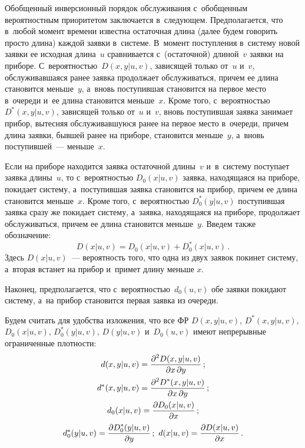 \begin{multicols}{2}
Обобщенный инверсионный порядок обслуживания
с~обобщенным вероятностным приоритетом заключается в~следующем.
Предполагается, что в~любой момент времени
известна остаточная длина (далее будем говорить
просто длина) каждой заявки в~системе.
В~момент поступления в~систему новой заявки ее
исходная длина~$u$ сравнивается с~(остаточной)
длиной~$v$ заявки на приборе.
С~вероятностью~$D(x,y|u,v)$, зависящей только от~$u$ и~$v$, обслуживавшаяся
ранее заявка продолжает обслуживаться, причем
ее длина становится меньше~$y$, а~вновь
поступившая становится на первое место в~очереди
и~ее длина становится меньше~$x$.
Кроме того, с~вероятностью~$D^*(x,y|u,v)$,
зависящей только от~$u$ и~$v$, вновь поступившая
заявка занимает прибор, вытесняя обслуживавшуюся
ранее на первое место в~очереди, причем длина
заявки, бывшей ранее на приборе, становится
меньше~$y$, а~вновь поступившей~--- меньше~$x$.

Если на приборе находится заявка остаточной
длины~$v$ и~в~систему поступает заявка
длины~$u$, то с~вероятностью $D_0(x|u,v)$
заявка, находящаяся на приборе, покидает
систему, а~поступившая заявка становится на
прибор, причем ее длина становится меньше~$x$.
Кроме того, с~вероятностью
$D_0^*(y|u,v)$ поступившая заявка сразу же
покидает систему, а~заявка, находящаяся на
приборе, продолжает обслуживаться, причем ее
длина становится меньше~$y$.
Введем также обозначение:
\begin{equation*}
D(x|u,v) = D_0(x|u,v) + D_0^*(x|u,v)\,.
\end{equation*}
Здесь $D(x|u,v)$~--- вероятность того, что одна
из двух заявок покинет систему, а~вторая встанет
на прибор и~примет длину меньше $x$.


Наконец, предполагается, что с~вероят\-ностью~$d_0(u,v)$ обе заявки покидают
систему, а~на прибор становится первая заявка
из очереди.

Будем считать для удобства изложения, что все
ФР $D(x,y|u,v)$, $D^*(x,y|u,v)$, $D_0(x|u,v)$,
$D_0^*(y|u,v)$, $D(y|u,v)$ и~$D_0(u,v)$
имеют непрерывные ограниченные плотности:
\begin{gather*}
d(x,y|u,v)=\displaystyle\frac{\displaystyle \partial^2 D(x,y|u,v)\mathstrut}{\displaystyle \partial x\, \partial y\mathstrut}\,;\\
d^*(x,y|u,v)=\displaystyle\frac{\displaystyle \partial^2 D^*(x,y|u,v)\mathstrut}{\displaystyle \partial x\, \partial y\mathstrut}\,;\\
d_0(x|u,v)= \displaystyle\frac{\displaystyle \partial D_0(x|u,v)\mathstrut}{\displaystyle \partial x\mathstrut}\,;\\
d_0^*(y|u,v)=\displaystyle\frac{\displaystyle \partial D_0^*(y|u,v)\mathstrut}{\displaystyle \partial y\mathstrut}\,;\
d(x|u,v)=\displaystyle\frac{\displaystyle \partial D(x|u,v)\mathstrut}{\displaystyle \partial x\mathstrut}\,.
\end{gather*}



\end{multicols}
